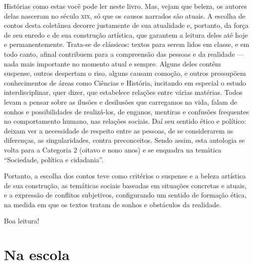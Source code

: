 Histórias como estas você pode ler neste livro. Mas, vejam que beleza,
os autores delas nasceram no século \textsc{xix}, só que os causos narrados são
atuais. A escolha de contos desta coletânea decorre justamente de sua
atualidade e, portanto, da força de seu enredo e de sua construção
artística, que garantem a leitura deles até hoje e permanentemente.
Trata-se de clássicos: textos para serem lidos em classe, e em todo
canto, afinal contribuem para a compreensão das pessoas e da realidade
--- nada mais importante no momento atual e sempre. Alguns deles contêm
suspense, outros despertam o riso, alguns causam comoção, e outros
pressupõem conhecimentos de áreas como Ciências e História, incitando em
especial o estudo interdisciplinar, quer dizer, que estabelece relações
entre várias matérias. Todos levam a pensar sobre as ilusões e
desilusões que carregamos na vida, falam de sonhos e possibilidades de
realizá-los, de enganos, mentiras e confusões frequentes no
comportamento humano, nas relações sociais. Daí seu sentido ético e
político: deixam ver a necessidade de respeito entre as pessoas, de se
considerarem as diferenças, as singularidades, contra preconceitos.
Sendo assim, esta antologia se volta para a Categoria 2 (oitavo e nono
anos) e se enquadra na temática ``Sociedade, política e
cidadania''.

Portanto, a escolha dos contos teve como critérios o suspense e a beleza
artística de sua construção, as temáticas sociais baseadas em situações
concretas e atuais, e a expressão de conflitos subjetivos, configurando
um sentido de formação ética, na medida em que os textos tratam de
sonhos e obstáculos da realidade.

Boa leitura!

\part{Na escola}

